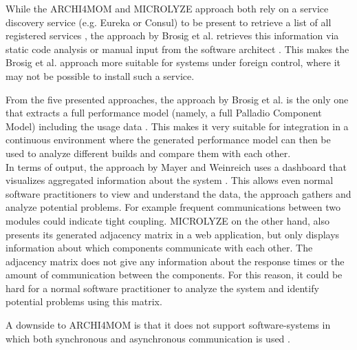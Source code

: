 While the ARCHI4MOM and MICROLYZE approach both rely on a service discovery service (e.g. Eureka or Consul) to be present to retrieve a list of all registered services \cite{Singh2022ARCHI4MOM,Kleehaus2018}, the approach by Brosig et al. retrieves this information via static code analysis or manual input from the software architect \cite{Brosig2011}.
This makes the Brosig et al. approach more suitable for systems under foreign control, where it may not be possible to install such a service.

From the five presented approaches, the approach by Brosig et al. is the only one that extracts a full performance model (namely, a full Palladio Component Model) including the usage data \cite{Brosig2011}.
This makes it very suitable for integration in a continuous environment where the generated performance model can then be used to analyze different builds and compare them with each other.
\\

In terms of output, the approach by Mayer and Weinreich uses a dashboard that visualizes aggregated information about the system \cite{Mayer2018}.
This allows even normal software practitioners to view and understand the data, the approach gathers and analyze potential problems.
For example frequent communications between two modules could indicate tight coupling.
MICROLYZE on the other hand, also presents its generated adjacency matrix in a web application, but only displays information about which components communicate with each other.
The adjacency matrix does not give any information about the response times or the amount of communication between the components.
For this reason, it could be hard for a normal software practitioner to analyze the system and identify potential problems using this matrix.







A downside to ARCHI4MOM is that it does not support software-systems in which both synchronous and asynchronous communication is used \cite{Singh2022ARCHI4MOM}.




